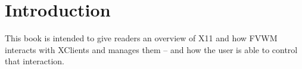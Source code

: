 \chapter{Introduction}

This book is intended to give readers an overview of X11 and how FVWM
interacts with XClients and manages them -- and how the user is able to
control that interaction.

